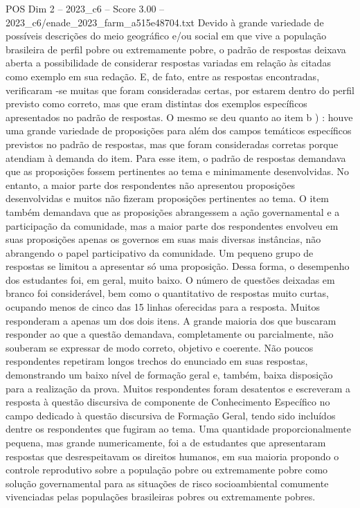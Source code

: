 \begin{textsample}{POS Dim 2 – 2023\_c6 – Score 3.00 – 2023\_c6/enade\_2023\_farm\_a515e48704.txt}
Devido à grande variedade de possíveis descrições do meio geográfico e/ou social em que vive a população brasileira de perfil pobre ou extremamente pobre, o padrão de respostas deixava aberta a possibilidade de considerar respostas variadas em relação às citadas como exemplo em sua redação.
E, de fato, entre as respostas encontradas, verificaram -se muitas que foram consideradas certas, por estarem dentro do perfil previsto como correto, mas que eram distintas dos exemplos específicos apresentados no padrão de respostas.
O mesmo se deu quanto ao item b ) : houve uma grande variedade de proposições para além dos campos temáticos específicos previstos no padrão de respostas, mas que foram consideradas corretas porque atendiam à demanda do item.
Para esse item, o padrão de respostas demandava que as proposições fossem pertinentes ao tema e minimamente desenvolvidas.
No entanto, a maior parte dos respondentes não apresentou proposições desenvolvidas e muitos não fizeram proposições pertinentes ao tema.
O item também demandava que as proposições abrangessem a ação governamental e a participação da comunidade, mas a maior parte dos respondentes envolveu em suas proposições apenas os governos em suas mais diversas instâncias, não abrangendo o papel participativo da comunidade.
Um pequeno grupo de respostas se limitou a apresentar só uma proposição.
Dessa forma, o desempenho dos estudantes foi, em geral, muito baixo.
O número de questões deixadas em branco foi considerável, bem como o quantitativo de respostas muito curtas, ocupando menos de cinco das 15 linhas oferecidas para a resposta.
Muitos responderam a apenas um dos dois itens.
A grande maioria dos que buscaram responder ao que a questão demandava, completamente ou parcialmente, não souberam se expressar de modo correto, objetivo e coerente.
Não poucos respondentes repetiram longos trechos do enunciado em suas respostas, demonstrando um baixo nível de formação geral e, também, baixa disposição para a realização da prova.
Muitos respondentes foram desatentos e escreveram a resposta à questão discursiva de componente de Conhecimento Específico no campo dedicado à questão discursiva de Formação Geral, tendo sido incluídos dentre os respondentes que fugiram ao tema.
Uma quantidade proporcionalmente pequena, mas grande numericamente, foi a de estudantes que apresentaram respostas que desrespeitavam os direitos humanos, em sua maioria propondo o controle reprodutivo sobre a população pobre ou extremamente pobre como solução governamental para as situações de risco socioambiental comumente vivenciadas pelas populações brasileiras pobres ou extremamente pobres.

\end{textsample}
